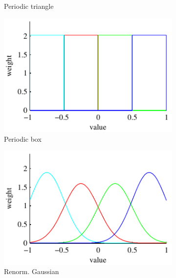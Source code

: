 \documentclass[thesis.tex]{subfiles}
\begin{document}
\begin{figure}
\begin{subfigure}[t]{0.32\textwidth}
		\caption{Periodic triangle}
		\label{fig:1dFilterTrianglePeriodic}
	\end{subfigure}
	\begin{subfigure}[t]{0.32\textwidth}
		\includegraphics[width=\textwidth]{img/binFilterBoxPeriodic.pdf}
		\caption{Periodic box}
		\label{fig:1dFilterBoxPeriodic}
	\end{subfigure}
	\begin{subfigure}[t]{0.32\textwidth}
		\includegraphics[width=\textwidth]{img/binFilterGaussianRenorm.pdf}
		\caption{Renorm. Gaussian}
		\label{fig:1dFilterGaussianRenorm}
	\end{subfigure}
	\begin{subfigure}[t]{0.32\textwidth}

\end{subfigure}
\end{figure}
\end{document}

